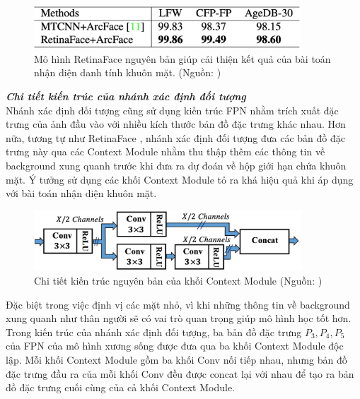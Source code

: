 {    \begin{figure}[H]
        \centering
        \includegraphics[width=10cm] {images/retinaface_results_2}
        \caption{Mô hình RetinaFace nguyên bản giúp cải thiện kết quả của bài toán nhận diện danh tính khuôn mặt. (Nguồn: \cite{deng2020retinaface})}
        \label{fig:retinaface_results_2}
    \end{figure}

    \noindent
    \textbf{\textit{Chi tiết kiến trúc của nhánh xác định đối tượng}} \\
    Nhánh xác định đối tượng cũng sử dụng kiến trúc FPN nhằm trích xuất đặc trưng của ảnh đầu vào với nhiều kích thước bản đồ đặc trưng khác nhau.
    Hơn nữa, tương tự như RetinaFace \cite{deng2020retinaface}, nhánh xác định đối tượng đưa các bản đồ đặc trưng này qua các Context Module \cite{najibi2017ssh} nhằm thu thập thêm các thông tin về background xung quanh trước khi đưa ra dự đoán về hộp giới hạn chứa khuôn mặt.
    Ý tưởng sử dụng các khối Context Module \cite{najibi2017ssh} tỏ ra khá hiệu quả khi áp dụng với bài toán nhận diện khuôn mặt.

    \begin{figure}[H]
        \centering
        \includegraphics[width=10cm] {images/retinaface_context_module}
        \caption{Chi tiết kiến trúc nguyên bản của khối Context Module (Nguồn: \cite{najibi2017ssh})}
        \label{fig:retinaface_context_module}
    \end{figure}

    \noindent
    Đặc biệt trong việc định vị các mặt nhỏ, vì khi những thông tin về background xung quanh như thân người sẽ có vai trò quan trọng giúp mô hình học tốt hơn.
    Trong kiến trúc của nhánh xác định đối tượng, ba bản đồ đặc trưng \textit{{${P}_{3}, {P}_{4}, {P}_{5}$}} của FPN của mô hình xương sống được đưa qua ba khối Context Module độc lập.
    Mỗi khối Context Module gồm ba khối Conv nối tiếp nhau, nhưng bản đồ đặc trưng đầu ra của mỗi khối Conv đều được concat lại với nhau để tạo ra bản đồ đặc trưng cuối cùng của cả khối Context Module. \\

}
